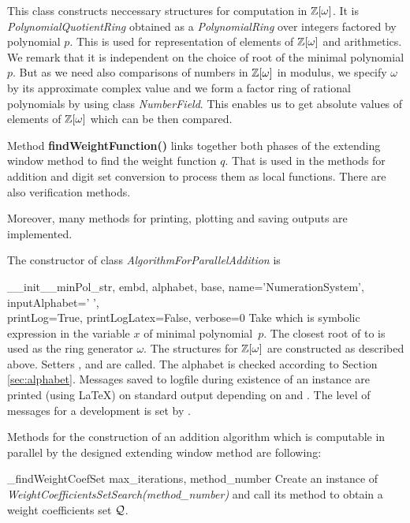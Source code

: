 This class constructs neccessary structures for computation in $\mathbb{Z}[\omega]$. It is \emph{PolynomialQuotientRing} obtained as a \emph{PolynomialRing} over integers factored by polynomial $p$. This is used for representation of elements of $\mathbb{Z}[\omega]$ and arithmetics. We remark that it is independent on the choice of root of the  minimal polynomial $p$. But as we need also comparisons of numbers in $\mathbb{Z}[\omega]$ in modulus, we specify $\omega$ by its approximate complex value and we form a factor ring of rational polynomials by using class \emph{NumberField}. This enables us to get absolute values of elements of $\mathbb{Z}[\omega]$ which can be then compared.

Method \textbf{findWeightFunction()} links together both phases of the extending window method to find the weight function $q$. That is used in the methods for addition and digit set conversion to process them as local functions. There are also verification methods.

Moreover, many methods for printing, plotting and saving outputs are implemented.

The constructor of class \emph{AlgorithmForParallelAddition} is 

\begin{method}{\_\_init\_\_}{minPol\_str, embd, alphabet, base, name='NumerationSystem', inputAlphabet=' ',\\
 printLog=True, printLogLatex=False, verbose=0}
Take  which is symbolic expression in the variable $x$ of minimal polynomial~$p$. The closest root of   to  is used as the ring generator $\omega$. The structures for $\mathbb{Z}[\omega]$ are constructed as described above. Setters ,  and  are called. The alphabet is checked according to Section \ref{sec:alphabet}. Messages saved to logfile during existence of an instance are printed (using \LaTeX) on standard output depending on  and . The level of messages for a development is set by . 
\end{method}

Methods for the construction of an addition algorithm which is computable in parallel by the designed extending window method are following:

\begin{method}{\_findWeightCoefSet}{ max\_iterations, method\_number}
Create an instance of \emph{WeightCoefficientsSetSearch(method\_number)} and call its method  to obtain a weight coefficients set $\mathcal{Q}$.
\end{method}

